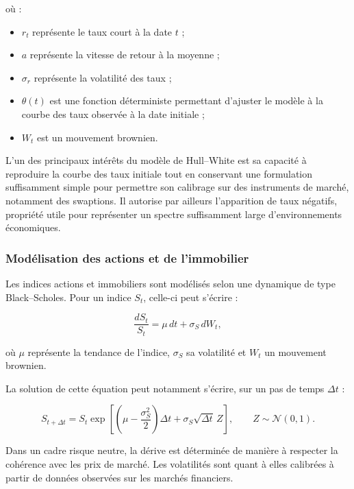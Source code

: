 où :
\begin{itemize}[noitemsep,topsep=2pt]
    \item $r_t$ représente le taux court à la date $t$ ;
    \item $a$ représente la vitesse de retour à la moyenne ;
    \item $\sigma_r$ représente la volatilité des taux ;
    \item $\theta(t)$ est une fonction déterministe permettant d'ajuster le modèle à la courbe des taux observée à la date initiale ;
    \item $W_t$ est un mouvement brownien.
\end{itemize}

L'un des principaux intérêts du modèle de Hull--White est sa capacité à reproduire la courbe des taux initiale tout en conservant une formulation suffisamment simple pour permettre son calibrage sur des instruments de marché, notamment des swaptions. Il autorise par ailleurs l'apparition de taux négatifs, propriété utile pour représenter un spectre suffisamment large d'environnements économiques.


\subsubsection*{Modélisation des actions et de l'immobilier}

Les indices actions et immobiliers sont modélisés selon une dynamique de type Black--Scholes. Pour un indice $S_t$, celle-ci peut s'écrire :

\begin{equation}
    \frac{dS_t}{S_t}
    =
    \mu\,dt+\sigma_S\,dW_t,
\end{equation}

où $\mu$ représente la tendance de l'indice, $\sigma_S$ sa volatilité et $W_t$ un mouvement brownien.

La solution de cette équation peut notamment s'écrire, sur un pas de temps $\Delta t$ :

\begin{equation}
    S_{t+\Delta t}
    =
    S_t
    \exp\left[
        \left(\mu-\frac{\sigma_S^2}{2}\right)\Delta t
        +\sigma_S\sqrt{\Delta t}\,Z
    \right],
    \qquad Z\sim\mathcal{N}(0,1).
\end{equation}

Dans un cadre risque neutre, la dérive est déterminée de manière à respecter la cohérence avec les prix de marché. Les volatilités sont quant à elles calibrées à partir de données observées sur les marchés financiers.


